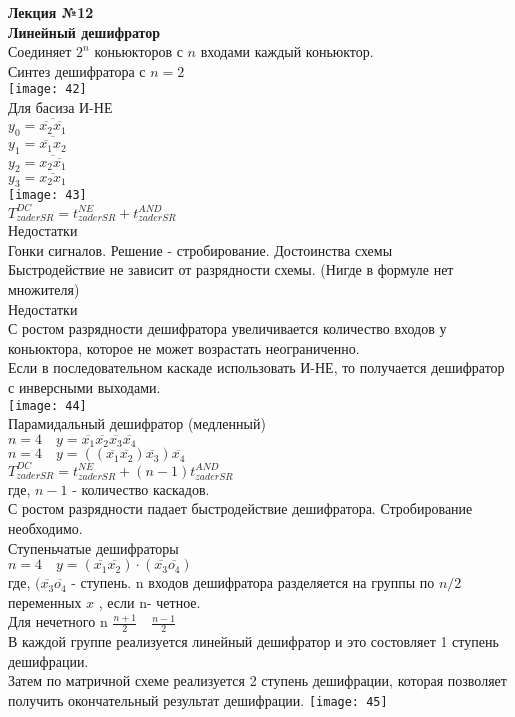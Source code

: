 

\LARGE{ \textbf {Лекция №12}}\\
\Large{ \textbf {Линейный дешифратор}}\\
Соединяет $ 2^n $ коньюкторов с $ n $ входами каждый коньюктор.\\
Синтез дешифратора с $ n = 2 $\\
\texttt{[image: 42]}\\
Для басиза И-НЕ\\
$ y_0 = \overline{ \overline{x_2} \overline{x_1}} $ \\
$ y_1 = \overline{ \overline{x_1} x_2}$\\
$ y_2 = \overline{ x_2 \overline{x_1}} $\\
$ y_3 =\overline{ x_2 x_1} $\\

\texttt{[image: 43]}\\
$T^{DC}_{zaderSR}= t_{zaderSR}^{NE} + t_{zaderSR}^{AND} $ \\
Недостатки\\
Гонки сигналов. Решение - стробирование.
Достоинства схемы\\
Быстродействие не зависит от разрядности схемы. (Нигде в формуле нет множителя)\\
Недостатки\\
С ростом разрядности дешифратора увеличивается количество входов у коньюктора, которое не может возрастать неограниченно.\\

Если в последовательном каскаде использовать И-НЕ, то получается дешифратор с инверсными выходами.\\
\texttt{[image: 44]}\\

Парамидальный дешифратор (медленный)\\
$ n = 4 \quad y = \overline{x_1} \overline{x_2} \overline{x_3} \overline{x_4} $\\
$ n = 4 \quad y = ((\overline{x_1} \overline{x_2}) \overline{x_3}) \overline{x_4} $\\
$T^{DC}_{zaderSR}= t_{zaderSR}^{NE} + (n-1) t_{zaderSR}^{AND} $ \\
где, $ n-1  $ - количество каскадов.\\
С ростом разрядности  падает быстродействие дешифратора. Стробирование необходимо.\\

Ступеньчатые дешифраторы \\
$ n = 4 \quad y = (\overline{x_1} \overline{x_2}) \cdot (\overline{x_3} \overline{o_4}) $\\
где, $  (\overline{x_3} \overline{o_4}  $ - ступень.
n входов дешифратора разделяется на  группы по $ n/2  $  переменных $ x$ , если n- четное.\\
Для нечетного n  $ \frac{n+1}{2} \quad \frac{n-1}{2} $\\
В каждой группе реализуется линейный дешифратор и это состовляет 1 ступень дешифрации.\\
Затем по матричной схеме реализуется 2 ступень дешифрации, которая позволяет получить окончательный результат дешифрации.
\texttt{[image: 45]}\\

